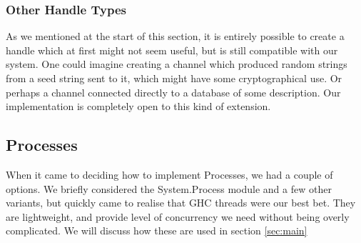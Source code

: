 \subsubsection{Other Handle Types}
As we mentioned at the start of this section, it is entirely possible to create a handle which at first might not seem useful, but is still compatible with our system. One could imagine creating a channel which produced random strings from a seed string sent to it, which might have some cryptographical use. Or perhaps a channel connected directly to a database of some description. Our implementation is completely open to this kind of extension.

\subsection{Processes}
\label{sec:processes}
When it came to deciding how to implement Processes, we had a couple of options. We briefly considered the System.Process module and a few other variants, but quickly came to realise that GHC threads were our best bet. They are lightweight, and provide level of concurrency we need without being overly complicated. We will discuss how these are used in section \ref{sec:main}  


